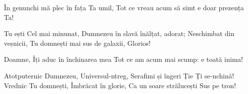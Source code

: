 \beginverse
În genunchi mă plec în fața Ta umil,
Tot ce vreau acum să simt e doar prezența Ta!
\endverse

\beginchorus
Tu ești Cel mai minunat,
Dumnezeu în slavă înălțat, adorat;
Neschimbat din veșnicii,
Tu domnești mai sus de galaxii,
Glorios!
\endchorus

\beginverse
Doamne, Îți aduc în închinarea mea
Tot ce am acum mai scump: e toată inima!
\endverse

\beginverse*
Atotputernic Dumnezeu,
Universul-ntreg,
Serafimi și îngeri
Ție Ți se-nchină!
Vrednic Tu domnești,
Îmbrăcat în glorie,
Ca un soare strălucești
Sus pe tron!
\endverse
\endsong